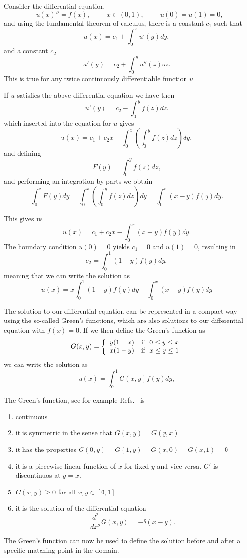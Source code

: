 Consider the differential equation
\begin{equation}\label{eq:poisson14}
   -u(x)''= f(x),\hspace{1cm} x \in (0,1),\hspace{1cm}u(0)=u(1)=0,
\end{equation}
and using the fundamental theorem of calculus, there is a constant $c_1$ such that
\[
u(x) = c_1+\int_0^xu'(y)dy,
\]
and a constant $c_2$ 
\[
u'(y) = c_2+\int_0^yu''(z)dz.
\]
This is true for any twice continuously differentiable function $u$

If $u$ satisfies the above differential equation  we have then
\[
u'(y) = c_2-\int_0^yf(z)dz.
\]
which inserted into the equation for $u$ gives
\[
u(x)= c_1+c_2x-\int_0^x \left(\int_0^yf(z)dz\right)dy,
\] and defining
\[
F(y) = \int_0^yf(z)dz,
\]
and performing an integration by parts  we obtain
\[
\int_0^x F(y)dy = \int_0^x \left(\int_0^yf(z)dz\right)dy = \int_0^x (x-y)f(y)dy.
\] 

This gives us
\[
u(x) = c_1+c_2x-\int_0^x (x-y)f(y)dy.
\]
The boundary condition $u(0)= 0$ yields $c_1=0$ and $u(1)=0$,  resulting in
\[
c_2=\int_0^1(1-y)f(y)dy,
\]
meaning that we can write the solution as
\[
u(x) = x\int^1_0(1-y)f(y)dy-\int_0^x(x-y)f(y)dy
\]

The solution to our differential equation can be represented in a compact way using the
so-called Green's functions, which are also solutions to our differential equation with 
$f(x)=0$.
If we then define  the Green's function as 
\[
G(x,y) = \left\{ \begin{array}{cc} y(1-x) & \mathrm{if}\hspace{0.2cm} 0\le y \le x \\
                                   x(1-y) & \mathrm{if}\hspace{0.2cm} x\le y \le 1\end{array}\right.
\]
we can write the solution as 
\[
u(x) = \int_0^1G(x,y)f(y)dy,
\]

The Green's function, see for example Refs.~\cite{arfken1985,tveito2002} is
\begin{svgraybox}
\begin{enumerate}
\item continuous
\item it is symmetric in the sense that $G(x,y) = G(y,x)$
\item it has the properties $G(0,y)=G(1,y)=G(x,0)=G(x,1) = 0$
\item it is a piecewise linear function of $x$ for fixed $y$ and vice versa.  $G'$ is discontinuos at $y=x$.
\item $G(x,y) \ge 0$ for all $x,y\in [0,1]$
\item  it is the solution of the differential equation 
\[
\frac{d^2}{dx^2} G(x,y) = -\delta(x-y).
\]
\end{enumerate}
\end{svgraybox}
The Green's function can now be used to define the solution before and 
after a specific matching point in the domain.

